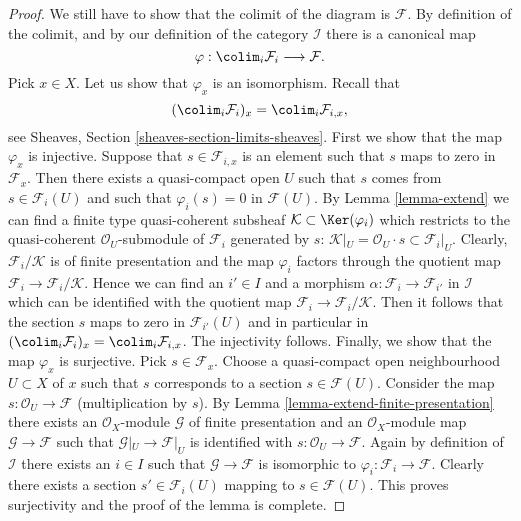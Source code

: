 \begin{proof}
\medskip\noindent
We still have to show that the colimit of the diagram is $\mathcal{F}$.
By definition of the colimit, and by our definition of the category
$\mathcal{I}$ there is a canonical map
$$
\varphi :
\colim_i \mathcal{F}_i
\longrightarrow
\mathcal{F}.
$$
Pick $x \in X$. Let us show that $\varphi_x$ is an isomorphism.
Recall that
$$
(\colim_i \mathcal{F}_i)_x
=
\colim_i \mathcal{F}_{i, x},
$$
see
Sheaves, Section \ref{sheaves-section-limits-sheaves}.
First we show that the map $\varphi_x$ is injective.
Suppose that $s \in \mathcal{F}_{i, x}$ is an element
such that $s$ maps to zero in $\mathcal{F}_x$. Then there exists
a quasi-compact open $U$ such that $s$ comes from $s \in \mathcal{F}_i(U)$
and such that $\varphi_i(s) = 0$ in $\mathcal{F}(U)$.
By Lemma \ref{lemma-extend}
we can find a finite type quasi-coherent subsheaf
$\mathcal{K} \subset \Ker(\varphi_i)$ which restricts to
the quasi-coherent $\mathcal{O}_U$-submodule of $\mathcal{F}_i$
generated by $s$:
$\mathcal{K}|_U = \mathcal{O}_U\cdot s \subset \mathcal{F}_i|_U$.
Clearly, $\mathcal{F}_i/\mathcal{K}$ is of finite presentation and
the map $\varphi_i$ factors through the quotient map
$\mathcal{F}_i \to \mathcal{F}_i/\mathcal{K}$. Hence we can find
an $i' \in I$ and a morphism $\alpha : \mathcal{F}_i \to \mathcal{F}_{i'}$
in $\mathcal{I}$ which can be identified with the quotient map
$\mathcal{F}_i \to \mathcal{F}_i/\mathcal{K}$. Then it follows
that the section $s$ maps to zero in $\mathcal{F}_{i'}(U)$ and
in particular in
$(\colim_i \mathcal{F}_i)_x =
\colim_i \mathcal{F}_{i, x}$.
The injectivity follows.
Finally, we show that the map $\varphi_x$ is surjective.
Pick $s \in \mathcal{F}_x$. Choose a quasi-compact open neighbourhood
$U \subset X$ of $x$ such that $s$ corresponds to a section
$s \in \mathcal{F}(U)$. Consider the map
$s : \mathcal{O}_U \to \mathcal{F}$ (multiplication by $s$).
By Lemma \ref{lemma-extend-finite-presentation}
there exists an $\mathcal{O}_X$-module $\mathcal{G}$
of finite presentation and an $\mathcal{O}_X$-module map
$\mathcal{G} \to \mathcal{F}$ such that $\mathcal{G}|_U \to \mathcal{F}|_U$
is identified with
$s : \mathcal{O}_U \to \mathcal{F}$.
Again by definition of $\mathcal{I}$ there exists an $i \in I$
such that $\mathcal{G} \to \mathcal{F}$ is isomorphic to
$\varphi_i : \mathcal{F}_i \to \mathcal{F}$. Clearly there exists
a section $s' \in \mathcal{F}_i(U)$ mapping to $s \in \mathcal{F}(U)$.
This proves surjectivity and the proof of the lemma is complete.
\end{proof}

